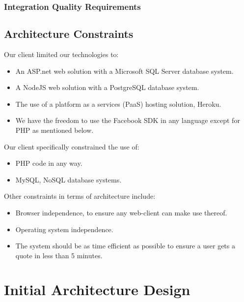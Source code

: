 \documentclass{article}
\begin{document}
		\subsubsection{Integration Quality Requirements}

	
	\subsection{Architecture Constraints}
	Our client limited our technologies to:
	\begin{itemize}
		\item An ASP.net web solution with a Microsoft SQL Server database system.
		\item A NodeJS web solution with a PostgreSQL database system.
		\item The use of a platform as a services (PaaS) hosting solution, Heroku.
		\item We have the freedom to use the Facebook SDK in any language except for PHP as mentioned below.
	\end{itemize}
	Our client specifically constrained the use of:
		\begin{itemize}
		\item PHP code in any way.
		\item MySQL, NoSQL database systems.
		\end{itemize}	
	Other constraints in terms of architecture include:
	\begin{itemize}
		\item Browser independence, to ensure any web-client can make use thereof.
		\item Operating system independence.
		\item The system should be as time efficient as possible to ensure a user gets a quote in less than 5 minutes.
		\end{itemize}
	
	
	\section{Initial Architecture Design}


	


	
\end{document}
